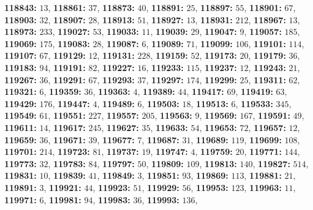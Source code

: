 \textsf{\bfseries 118843:} $13$, \textsf{\bfseries 118861:} $37$, \textsf{\bfseries 118873:} $40$, \textsf{\bfseries 118891:} $25$, \textsf{\bfseries 118897:} $55$, \textsf{\bfseries 118901:} $67$, \textsf{\bfseries 118903:} $32$, \textsf{\bfseries 118907:} $28$, \textsf{\bfseries 118913:} $51$, \textsf{\bfseries 118927:} $13$, \textsf{\bfseries 118931:} $212$, \textsf{\bfseries 118967:} $13$, \textsf{\bfseries 118973:} $233$, \textsf{\bfseries 119027:} $53$, \textsf{\bfseries 119033:} $11$, \textsf{\bfseries 119039:} $29$, \textsf{\bfseries 119047:} $9$, \textsf{\bfseries 119057:} $185$, \textsf{\bfseries 119069:} $175$, \textsf{\bfseries 119083:} $28$, \textsf{\bfseries 119087:} $6$, \textsf{\bfseries 119089:} $71$, \textsf{\bfseries 119099:} $106$, \textsf{\bfseries 119101:} $114$, \textsf{\bfseries 119107:} $67$, \textsf{\bfseries 119129:} $12$, \textsf{\bfseries 119131:} $228$, \textsf{\bfseries 119159:} $52$, \textsf{\bfseries 119173:} $20$, \textsf{\bfseries 119179:} $36$, \textsf{\bfseries 119183:} $94$, \textsf{\bfseries 119191:} $82$, \textsf{\bfseries 119227:} $16$, \textsf{\bfseries 119233:} $115$, \textsf{\bfseries 119237:} $12$, \textsf{\bfseries 119243:} $21$, \textsf{\bfseries 119267:} $36$, \textsf{\bfseries 119291:} $67$, \textsf{\bfseries 119293:} $37$, \textsf{\bfseries 119297:} $174$, \textsf{\bfseries 119299:} $25$, \textsf{\bfseries 119311:} $62$, \textsf{\bfseries 119321:} $6$, \textsf{\bfseries 119359:} $36$, \textsf{\bfseries 119363:} $4$, \textsf{\bfseries 119389:} $44$, \textsf{\bfseries 119417:} $69$, \textsf{\bfseries 119419:} $63$, \textsf{\bfseries 119429:} $176$, \textsf{\bfseries 119447:} $4$, \textsf{\bfseries 119489:} $6$, \textsf{\bfseries 119503:} $18$, \textsf{\bfseries 119513:} $6$, \textsf{\bfseries 119533:} $345$, \textsf{\bfseries 119549:} $61$, \textsf{\bfseries 119551:} $227$, \textsf{\bfseries 119557:} $205$, \textsf{\bfseries 119563:} $9$, \textsf{\bfseries 119569:} $167$, \textsf{\bfseries 119591:} $49$, \textsf{\bfseries 119611:} $14$, \textsf{\bfseries 119617:} $245$, \textsf{\bfseries 119627:} $35$, \textsf{\bfseries 119633:} $54$, \textsf{\bfseries 119653:} $72$, \textsf{\bfseries 119657:} $12$, \textsf{\bfseries 119659:} $36$, \textsf{\bfseries 119671:} $39$, \textsf{\bfseries 119677:} $7$, \textsf{\bfseries 119687:} $31$, \textsf{\bfseries 119689:} $119$, \textsf{\bfseries 119699:} $108$, \textsf{\bfseries 119701:} $214$, \textsf{\bfseries 119723:} $81$, \textsf{\bfseries 119737:} $19$, \textsf{\bfseries 119747:} $4$, \textsf{\bfseries 119759:} $20$, \textsf{\bfseries 119771:} $144$, \textsf{\bfseries 119773:} $32$, \textsf{\bfseries 119783:} $84$, \textsf{\bfseries 119797:} $50$, \textsf{\bfseries 119809:} $109$, \textsf{\bfseries 119813:} $140$, \textsf{\bfseries 119827:} $514$, \textsf{\bfseries 119831:} $10$, \textsf{\bfseries 119839:} $41$, \textsf{\bfseries 119849:} $3$, \textsf{\bfseries 119851:} $93$, \textsf{\bfseries 119869:} $113$, \textsf{\bfseries 119881:} $21$, \textsf{\bfseries 119891:} $3$, \textsf{\bfseries 119921:} $44$, \textsf{\bfseries 119923:} $51$, \textsf{\bfseries 119929:} $56$, \textsf{\bfseries 119953:} $123$, \textsf{\bfseries 119963:} $11$, \textsf{\bfseries 119971:} $6$, \textsf{\bfseries 119981:} $94$, \textsf{\bfseries 119983:} $36$, \textsf{\bfseries 119993:} $136$, 

